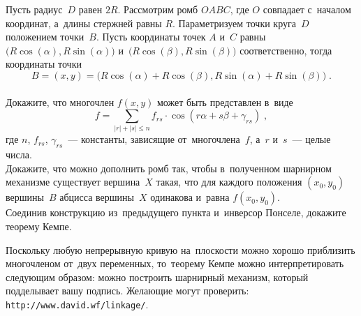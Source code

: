 \begin{problems}

\item
Пусть радиус~$D$ равен $2 R$.
Рассмотрим ромб $OABC$, где $O$ совпадает с~началом координат, а~длины стержней
равны $R$.
Параметризуем точки круга~$D$ положением точки~$B$.
Пусть координаты точек $A$ и~$C$ равны
\(
    \bigl( R \cos(\alpha), R \sin(\alpha) \bigr)
\)
и~\(
    \bigl( R \cos(\beta), R \sin(\beta) \bigr)
\)
соответственно, тогда координаты точки
\[
    B
=
    (x, y)
=
    \bigl(
        R \cos(\alpha) + R \cos(\beta),
        R \sin(\alpha) + R \sin(\beta)
    \bigr)
\; . \]
\\
\subproblem
Докажите, что многочлен $f(x, y)$ может быть представлен в~виде
\[
    f
=
    \sum\limits_{|r| + |s| \leq n}
        f_{rs} \cdot \cos(r \alpha + s \beta + \gamma_{rs})
\; , \]
где $n$, $f_{rs}$, $\gamma_{rs}$~--- константы, зависящие от~многочлена~$f$,
а~$r$ и~$s$~--- целые числа.
\\
\subproblem
Докажите, что можно дополнить ромб так, чтобы в~полученном шарнирном механизме
существует вершина~$X$ такая, что для каждого положения $(x_0, y_0)$
вершины~$B$ абцисса вершины~$X$ одинакова и~равна $f(x_0, y_0)$.
\\
\subproblem
Соединив конструкцию из~предыдущего пункта и~инверсор Понселе, докажите
теорему Кемпе.

\end{problems}

Поскольку любую непрерывную кривую на~плоскости можно хорошо приблизить
многочленом от~двух переменных, то~теорему Кемпе можно интерпретировать
следующим образом: можно построить шарнирный механизм, который подделывает
вашу подпись.
Желающие могут проверить:
\\
\begingroup\providecommand\url{\texttt}%
\url{http://www.david.wf/linkage/}.
\endgroup

